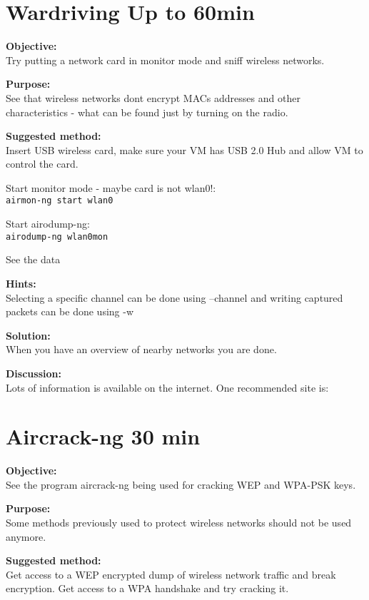 \documentclass[a4paper,11pt,notitlepage]{report}
\begin{document}
\chapter{Wardriving Up to 60min}
\label{ex:wardriving}

{\bf Objective:}\\
Try putting a network card in monitor mode and sniff wireless networks.

{\bf Purpose:}\\
See that wireless networks dont encrypt MACs addresses and other characteristics - what can be found just by turning on the radio.

{\bf Suggested method:}\\
Insert USB wireless card, make sure your VM has USB 2.0 Hub and allow VM to control the card.

Start monitor mode - maybe card is not wlan0!:\\
\verb+airmon-ng start wlan0+

Start airodump-ng:\\
\verb+airodump-ng wlan0mon+

See the data

{\bf Hints:}\\
Selecting a specific channel can be done using --channel and writing captured packets can be done using -w

{\bf Solution:}\\
When you have an overview of nearby networks you are done.

{\bf Discussion:}\\

Lots of information is available on the internet. One recommended site is:\\


\chapter{Aircrack-ng 30 min}
\label{ex:aircrack-ng}

{\bf Objective:}\\
See the program aircrack-ng being used for cracking WEP and WPA-PSK keys.

{\bf Purpose:}\\
Some methods previously used to protect wireless networks should not be used anymore.

{\bf Suggested method:}\\
Get access to a WEP encrypted dump of wireless network traffic and break encryption. Get access to a WPA handshake and try cracking it.
\end{document}
